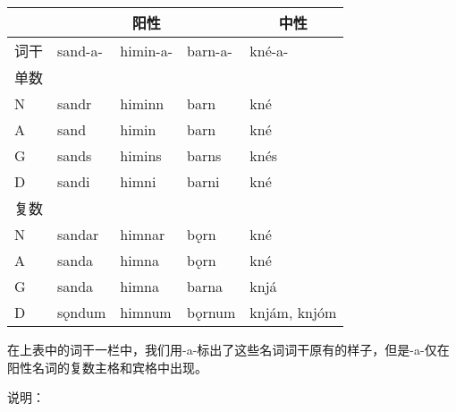 \begin{longtable}{lllll}
  \toprule
     & \multicolumn{3}{c}{\textbf{阳性}} & \multicolumn{1}{c}{\textbf{中性}}                          \\
  \midrule
  \endhead
  \bottomrule
  \endfoot
  词干 & sand-a-                         & himin-a-                        & barn-a- & kné-a-       \\
  单数 &                                 &                                 &         &              \\
  N  & sandr                           & himinn                          & barn    & kné          \\
  A  & sand                            & himin                           & barn    & kné          \\
  G  & sands                           & himins                          & barns   & knés         \\
  D  & sandi                           & himni                           & barni   & kné          \\
  复数 &                                 &                                 &         &              \\
  N  & sandar                          & himnar                          & bǫrn    & kné          \\
  A  & sanda                           & himna                           & bǫrn    & kné          \\
  G  & sanda                           & himna                           & barna   & knjá         \\
  D  & sǫndum                          & himnum                          & bǫrnum  & knjám, knjóm \\
\end{longtable}

在上表中的词干一栏中，我们用-a-标出了这些名词词干原有的样子，但是-a-仅在阳性名词的复数主格和宾格中出现。

说明：

